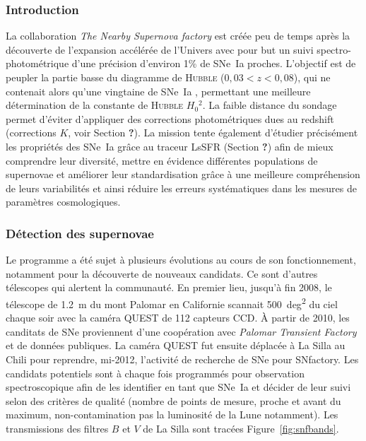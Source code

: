 \documentclass[../main/main.tex]{subfiles}
\begin{document}
\subsubsection{Introduction}\label{sssec:snfintro}

La collaboration \textit{The Nearby Supernova factory}
\citep[SNfactory,][]{aldering2002} est créée peu de temps après la découverte de
l'expansion accélérée de l'Univers \citep{riess1998, perlmutter1999} avec pour
but un suivi spectro-photométrique d'une précision d'environ 1\% de SNe~Ia
proches. L'objectif est de peupler la partie basse du diagramme de
\textsc{Hubble} ($0,03 < z < 0,08$), qui ne contenait alors qu'une vingtaine de
SNe~Ia \citep{hamuy1996}, permettant une meilleure détermination de la constante
de \textsc{Hubble} $H_0{}^2$. La faible distance du sondage permet d'éviter
d'appliquer des corrections photométriques dues au redshift
(corrections $K$, voir Section \textbf{?}). La mission tente également d'étudier
précisément les propriétés des SNe~Ia grâce au traceur LsSFR (Section
\textbf{?}) afin de mieux comprendre leur diversité, mettre en évidence
différentes populations de supernovae et améliorer leur standardisation grâce à
une meilleure compréhension de leurs variabilités et ainsi réduire les erreurs
systématiques dans les mesures de paramètres cosmologiques.

\subsubsection{Détection des supernovae}\label{sssec:snfdetec}

Le programme a été sujet à plusieurs évolutions au cours de son fonctionnement,
notamment pour la découverte de nouveaux candidats. Ce sont d'autres télescopes
qui alertent la communauté. En premier lieu, jusqu'à fin 2008, le télescope de
\SI{1,2}{m} du mont Palomar en Californie \citep{rabinowitz2003} scannait
\SI{500}{deg^2} du ciel chaque soir avec la caméra QUEST de 112 capteurs CCD. À
partir de 2010, les canditats de SNe proviennent d'une coopération avec
\textit{Palomar Transient Factory} \citep[PTF,][]{law2009} et de données
publiques. La caméra QUEST fut ensuite déplacée à La Silla au Chili
\citep[LSQ,][]{hadjiyska2012} pour reprendre, mi-2012, l'activité de recherche
de SNe pour SNfactory. Les candidats potentiels sont à chaque fois programmés
pour observation spectroscopique afin de les identifier en tant que SNe~Ia et
décider de leur suivi selon des critères de qualité (nombre de points de mesure,
proche et avant du maximum, non-contamination pas la luminosité de la Lune
notamment). Les transmissions des filtres $B$ et $V$ de La Silla sont tracées
Figure~\ref{fig:snfbands}.
\end{document}
